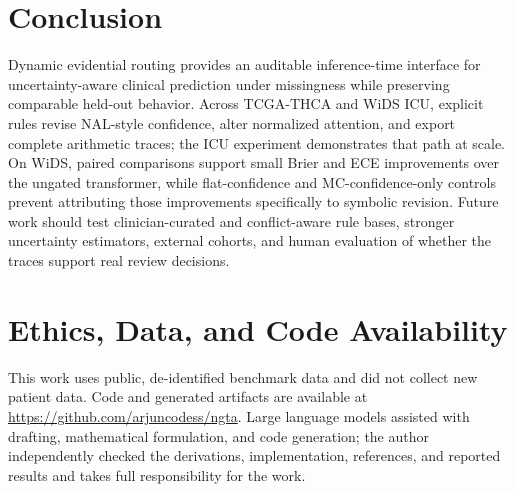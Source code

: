\documentclass[final]{nesy2026}
\begin{document}
\section{Conclusion}
\label{sec:conclusion}

Dynamic evidential routing provides an auditable inference-time interface for uncertainty-aware clinical prediction under missingness while preserving comparable held-out behavior. Across TCGA-THCA and WiDS ICU, explicit rules revise NAL-style confidence, alter normalized attention, and export complete arithmetic traces; the ICU experiment demonstrates that path at scale. On WiDS, paired comparisons support small Brier and ECE improvements over the ungated transformer, while flat-confidence and MC-confidence-only controls prevent attributing those improvements specifically to symbolic revision. Future work should test clinician-curated and conflict-aware rule bases, stronger uncertainty estimators, external cohorts, and human evaluation of whether the traces support real review decisions.

\section*{Ethics, Data, and Code Availability}

This work uses public, de-identified benchmark data and did not collect new patient data. Code and generated artifacts are available at \url{https://github.com/arjuncodess/ngta}. Large language models assisted with drafting, mathematical formulation, and code generation; the author independently checked the derivations, implementation, references, and reported results and takes full responsibility for the work.



\end{document}

